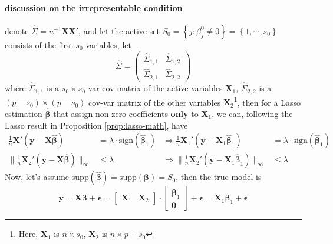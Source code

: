 \documentclass[twoside]{article}
\begin{document}
\paragraph*{discussion on the irrepresentable condition} denote $\hat{\Sigma}=n^{-1}\mathbf{XX}'$, and let the active set $S_0=\left\{ j:\beta^0_j\neq 0 \right\}=\left\{ 1,\cdots, s_0 \right\}$ consists of the first $s_0$ variables, let 
$$ \hat{\Sigma} = \left( \begin{matrix}
    \hat{\Sigma}_{1,1} & \hat{\Sigma}_{1,2} \\
    \hat{\Sigma}_{2,1} & \hat{\Sigma}_{2,2}
\end{matrix} \right) $$
where $\hat{\Sigma}_{1,1}$ is a $s_0\times s_0$ var-cov matrix of the active variables $\mathbf{X}_1$, $\hat{\Sigma}_{2,2}$ is a $(p-s_0)\times (p-s_0)$ cov-var matrix of the other variables $\mathbf{X}_2$\footnote{Here, $\mathbf{X}_1$ is $n\times s_0$, $\mathbf{X}_2$ is $n\times p-s_0$}, then for a Lasso estimation $\hat{\boldsymbol{\beta}}$ that assign non-zero coefficients \textbf{only} to $\mathbf{X}_1$, we can, following the Lasso result in Proposition \ref{prop:lasso-math}, have
\begin{equation}\label{eq:lasso_consist}
    \begin{aligned}
        \frac{1}{n}\mathbf{X}'\left(\mathbf{y}-\mathbf{X}\hat{\boldsymbol{\beta}}\right) &= \lambda \cdot \mathrm{sign}(\hat{\boldsymbol{\beta}}_1) & \Rightarrow \frac{1}{n}\mathbf{X}_1'\left(\mathbf{y}-\mathbf{X}_1\hat{\boldsymbol{\beta}}_1\right) &= \lambda \cdot \mathrm{sign}(\hat{\boldsymbol{\beta}}_1) \\
        \lVert \frac{1}{n}\mathbf{X}_2'\left(\mathbf{y}-\mathbf{X}\hat{\boldsymbol{\beta}}\right) \rVert _{\infty} &\leq \lambda & \Rightarrow \lVert \frac{1}{n}\mathbf{X}_2'\left(\mathbf{y}-\mathbf{X}_1\hat{\boldsymbol{\beta}}_1\right) \rVert _{\infty} &\leq \lambda
    \end{aligned}
\end{equation}
Now, let's assume $ \mathrm{supp}(\hat{\boldsymbol{\beta}}) = \mathrm{supp}(\boldsymbol{\beta}) = S_0 $, then the true model is
$$
\mathbf{y} = \mathbf{X}\boldsymbol{\beta} + \boldsymbol{\epsilon} = \begin{bmatrix}
    \mathbf{X}_1 &\mathbf{X}_2
\end{bmatrix}\cdot \begin{bmatrix}
    \boldsymbol{\beta}_1 \\ \mathbf{0}
\end{bmatrix} + \boldsymbol{\epsilon} = \mathbf{X}_1\boldsymbol{\beta}_1+\boldsymbol{\epsilon}
$$
\end{document}
